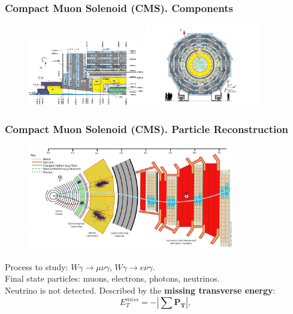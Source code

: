 \begin{frame}\frametitle{Compact Muon Solenoid (CMS). Components}
\begin{figure}[htb]
  \begin{center}
    {\includegraphics[width=0.45\textwidth]{../figs/Exp/CMSview1.png}
     \includegraphics[width=0.45\textwidth]{../figs/Exp/CMSview.png}}
  \end{center}
\end{figure}
\end{frame}%


\begin{frame}\frametitle{Compact Muon Solenoid (CMS). Particle Reconstruction}
\begin{figure}[htb]
  \begin{center}
    {\includegraphics[width=0.80\textwidth]{../figs/Exp/CMS_Slice.png}}
  \end{center}
\end{figure}

\scriptsize
Process to study: $W\gamma\rightarrow\mu\nu\gamma$, $W\gamma\rightarrow e\nu\gamma$.\\
Final state particles: muons, electrons, photons, neutrinos.\\
Neutrino is not detected. Described by the {\bfseries{missing transverse energy}}:\\ 
\begin{equation}\label{eq:MET}
  E_T^{miss} = - | \sum \mathbf{P_T} |,
\end{equation}
\end{frame}%


